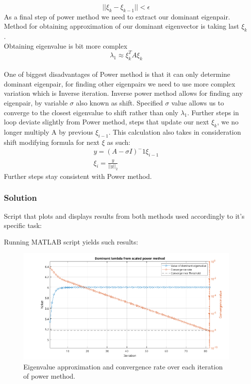 \begin{equation*}
    ||\xi_k - \xi_{k-1}|| < \epsilon
\end{equation*}
As a final step of power method we need to extract our dominant eigenpair. 
Method for obtaining approximation of our dominant eigenvector is taking last $\xi_k$.\\
Obtaining eigenvalue is bit more complex
\begin{equation*}
    \lambda_1 \approx \xi_k^T A \xi_k 
\end{equation*}
\\
One of biggest disadvantages of Power method is that it can only determine dominant eigenpair, for finding other eigenpairs we need to use more complex variation which is Inverse iteration.
Inverse power method allows for finding any eigenpair, by variable $\sigma$ also known as shift\cite{Demmel}.
Specified $\sigma$ value allows us to converge to the closest eigenvalue to shift rather than only $\lambda_1$. Further steps in loop deviate slightly from Power method, steps that update our next $\xi_k$, we no longer multiply A by previous $\xi_{i-1}$. This calculation also takes in consideration shift modifying formula for next $\xi$ as such:
\begin{equation*}
    \begin{matrix}
        y = (A - \sigma I)^-1 \xi_{i-1}\\
        \xi_i = \frac{y}{||y||_2}
    \end{matrix}
\end{equation*}
Further steps stay consistent with Power method.

\subsubsection*{Solution}
Script that plots and displays results from both methods used accordingly to it's specific task:


Running MATLAB script yields such results:


\begin{figure}[H]
    \centering
    \includegraphics[width=1\textwidth]{problems/Figures/Problem2ScaledPowerMethod.png}
    \caption{Eigenvalue approximation and convergence rate over each iteration of power method.}
    \label{fig:Power}
\end{figure}

